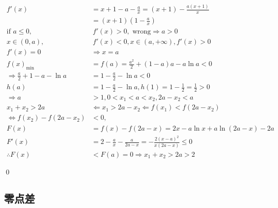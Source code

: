 \begin{jie}
            \begin{align*}
            f'(x) &= x + 1 - a - \frac{a}{x} = (x + 1) - \frac{a(x + 1)}{x} \\
            &= (x + 1)\left(1 - \frac{a}{x}\right) \\
            \text{if } a \leqslant 0, & \ f'(x) > 0, \text{ wrong} \Rightarrow a > 0 \\
            x \in (0, a), & \ f'(x) < 0, x \in (a, +\infty), f'(x) > 0 \\
            f'(x) = 0 & \Rightarrow x = a \\
            f(x)_{\min} &= f(a) = \frac{a^2}{2} + (1-a)a - a\ln a < 0 \\
            \Rightarrow \frac{a}{2} + 1 - a - \ln a &= 1 - \frac{a}{2} - \ln a < 0 \\
            h(a) &= 1 - \frac{a}{2} - \ln a, h(1) = 1 - \frac{1}{2} = \frac{1}{2} > 0 \\
            \Rightarrow a &> 1, 0 < x_1 < a < x_2, 2a - x_2 < a \\
            x_1 + x_2 > 2a &\Leftarrow x_1 > 2a - x_2 \Leftarrow f(x_1) < f(2a - x_2) \\
            \Leftrightarrow f(x_2) - f(2a - x_2) &< 0, \\
            F(x) &= f(x) - f(2a - x) = 2x - a\ln x + a\ln(2a - x) - 2a \\
            F'(x) &= 2 - \frac{a}{x} - \frac{a}{2a - x} = -\frac{2(x - a)^2}{x(2a - x)} \leqslant 0 \\
            \therefore F(x) &< F(a) = 0 \Rightarrow x_1 + x_2 > 2a > 2
            \end{align*}
            
            \qed
\end{jie}





\clearpage
\subsection{零点差}
\clearpage
